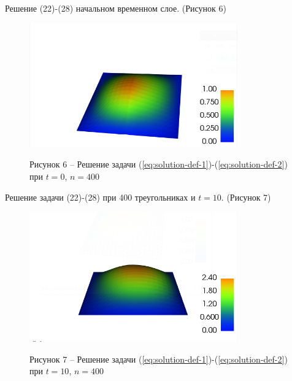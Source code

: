 Решение (22)-(28) начальном временном слое. (Рисунок 6)
\begin{figure}[H]
      \centering
      \includegraphics[width=0.8\textwidth]{plots/n20t0.png}\\
      \centering\caption*{Рисунок 6 -- Решение задачи (\ref{eq:solution-def-1})-(\ref{eq:solution-def-2}) при $t=0$, $n=400$}
\end{figure}

Решение задачи (22)-(28) при 400 треугольниках и $t=10$. (Рисунок 7)
\begin{figure}[H]
      \centering
      \includegraphics[width=0.8\textwidth]{plots/n20t10.png}\\
      \centering\caption*{Рисунок 7 -- Решение задачи (\ref{eq:solution-def-1})-(\ref{eq:solution-def-2}) при $t=10$, $n=400$}
\end{figure}

